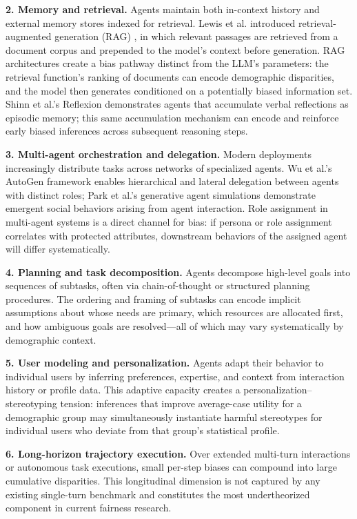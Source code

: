 \documentclass[sigconf,nonacm]{acmart}
\begin{document}
\textbf{2. Memory and retrieval.} Agents maintain both in-context history and external memory stores indexed for retrieval. Lewis et al. introduced retrieval-augmented generation (RAG) \cite{lewis2020retrieval}, in which relevant passages are retrieved from a document corpus and prepended to the model's context before generation. RAG architectures create a bias pathway distinct from the LLM's parameters: the retrieval function's ranking of documents can encode demographic disparities, and the model then generates conditioned on a potentially biased information set. Shinn et al.'s Reflexion \cite{shinn2023reflexion} demonstrates agents that accumulate verbal reflections as episodic memory; this same accumulation mechanism can encode and reinforce early biased inferences across subsequent reasoning steps.

\textbf{3. Multi-agent orchestration and delegation.} Modern deployments increasingly distribute tasks across networks of specialized agents. Wu et al.'s AutoGen framework \cite{wu2023autogen} enables hierarchical and lateral delegation between agents with distinct roles; Park et al.'s generative agent simulations \cite{park2023generative} demonstrate emergent social behaviors arising from agent interaction. Role assignment in multi-agent systems is a direct channel for bias: if persona or role assignment correlates with protected attributes, downstream behaviors of the assigned agent will differ systematically.

\textbf{4. Planning and task decomposition.} Agents decompose high-level goals into sequences of subtasks, often via chain-of-thought or structured planning procedures. The ordering and framing of subtasks can encode implicit assumptions about whose needs are primary, which resources are allocated first, and how ambiguous goals are resolved—all of which may vary systematically by demographic context.

\textbf{5. User modeling and personalization.} Agents adapt their behavior to individual users by inferring preferences, expertise, and context from interaction history or profile data. This adaptive capacity creates a personalization–stereotyping tension: inferences that improve average-case utility for a demographic group may simultaneously instantiate harmful stereotypes for individual users who deviate from that group's statistical profile.

\textbf{6. Long-horizon trajectory execution.} Over extended multi-turn interactions or autonomous task executions, small per-step biases can compound into large cumulative disparities. This longitudinal dimension is not captured by any existing single-turn benchmark and constitutes the most undertheorized component in current fairness research.
\end{document}
